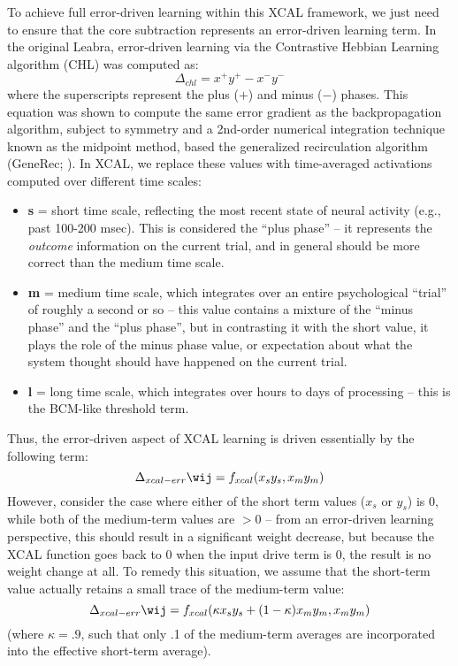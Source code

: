 To achieve full error-driven learning within this XCAL framework, we just need to ensure that the core subtraction represents an error-driven learning term.  In the original Leabra, error-driven learning via the Contrastive Hebbian Learning algorithm (CHL) was computed as:
\begin{equation}
 \Delta_{chl} = x^+ y^+ - x^- y^-
 \label{eq:chl}
\end{equation}
where the superscripts represent the plus ($+$) and minus ($-$) phases. This equation was shown to compute the same error gradient as the backpropagation algorithm, subject to symmetry and a 2nd-order numerical integration technique known as the midpoint method, based the generalized recirculation algorithm (GeneRec; \cite{OReilly96}). In XCAL, we replace these values with time-averaged activations computed over different time scales:
\begin{itemize}
\item {\bf s} = short time scale, reflecting the most recent state of neural  activity (e.g., past 100-200 msec). This is considered the ``plus phase'' -- it represents the {\em outcome} information on the current trial, and in  general should be more correct than the medium time scale.
\item {\bf m} = medium time scale, which integrates over an entire  psychological ``trial'' of roughly a second or so -- this value contains a mixture of the ``minus phase'' and the ``plus phase'', but in contrasting it  with the short value, it plays the role of the minus phase value, or expectation about what the system thought should have happened on the  current trial.
\item {\bf l} = long time scale, which integrates over hours to days of processing -- this is the BCM-like threshold term.
\end{itemize}

Thus, the error-driven aspect of XCAL learning is driven essentially by the following term: 
\begin{equation}
 \Delta_{xcal-err} \wij = f_{xcal} ( x_s y_s, x_m y_m )
 \label{eq.xcal-err}
\end{equation}
However, consider the case where either of the short term values ($x_s$ or $y_s$) is 0, while both of the medium-term values are $>0$ -- from an error-driven learning perspective, this should result in a significant weight decrease, but because the XCAL function goes back to 0 when the input drive term is 0, the result is no weight change at all. To remedy this situation, we assume that the short-term value actually retains a small trace of the medium-term value:
\begin{equation}
 \Delta_{xcal-err} \wij = f_{xcal} ( \kappa x_s y_s + (1-\kappa) x_m y_m, x_m y_m)
 \label{eq.xcal-err2}
\end{equation}
(where $\kappa = .9$, such that only .1 of the medium-term averages are incorporated into the effective short-term average).

